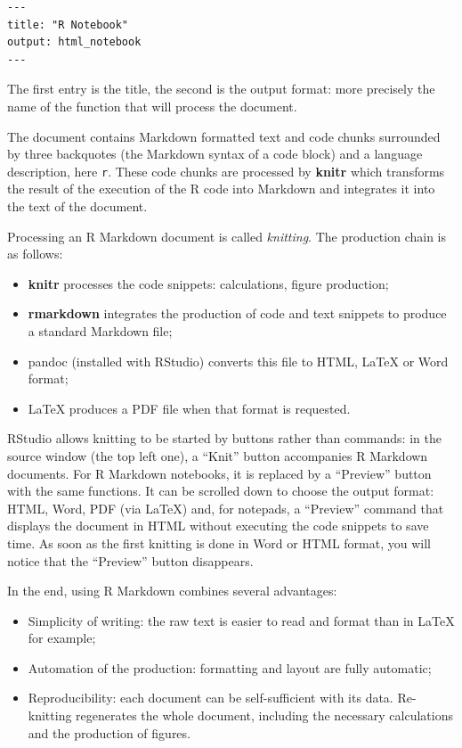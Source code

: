 \documentclass[
  12pt,
  american,
  a4paper,
  extrafontsizes,onecolumn,openright
  ]{memoir}
\providecommand{\tightlist}{%
  \setlength{\itemsep}{0pt}\setlength{\parskip}{0pt}}
\begin{document}
\begin{verbatim}
---
title: "R Notebook"
output: html_notebook
---
\end{verbatim}

The first entry is the title, the second is the output format: more precisely the name of the function that will process the document.

The document contains Markdown formatted text and code chunks surrounded by three backquotes (the Markdown syntax of a code block) and a language description, here \texttt{r}.
These code chunks are processed by \textbf{knitr} which transforms the result of the execution of the R code into Markdown and integrates it into the text of the document.

Processing an R Markdown document is called \emph{knitting}.
The production chain is as follows:

\begin{itemize}
\tightlist
\item
  \textbf{knitr} processes the code snippets: calculations, figure production;
\item
  \textbf{rmarkdown} integrates the production of code and text snippets to produce a standard Markdown file;
\item
  pandoc (installed with RStudio) converts this file to HTML, LaTeX or Word format;
\item
  LaTeX produces a PDF file when that format is requested.
\end{itemize}

RStudio allows knitting to be started by buttons rather than commands: in the source window (the top left one), a \enquote{Knit} button accompanies R Markdown documents.
For R Markdown notebooks, it is replaced by a \enquote{Preview} button with the same functions.
It can be scrolled down to choose the output format: HTML, Word, PDF (via LaTeX) and, for notepads, a \enquote{Preview} command that displays the document in HTML without executing the code snippets to save time.
As soon as the first knitting is done in Word or HTML format, you will notice that the \enquote{Preview} button disappears.

In the end, using R Markdown combines several advantages:

\begin{itemize}
\tightlist
\item
  Simplicity of writing: the raw text is easier to read and format than in LaTeX for example;
\item
  Automation of the production: formatting and layout are fully automatic;
\item
  Reproducibility: each document can be self-sufficient with its data. Re-knitting regenerates the whole document, including the necessary calculations and the production of figures.
\end{itemize}
\end{document}
